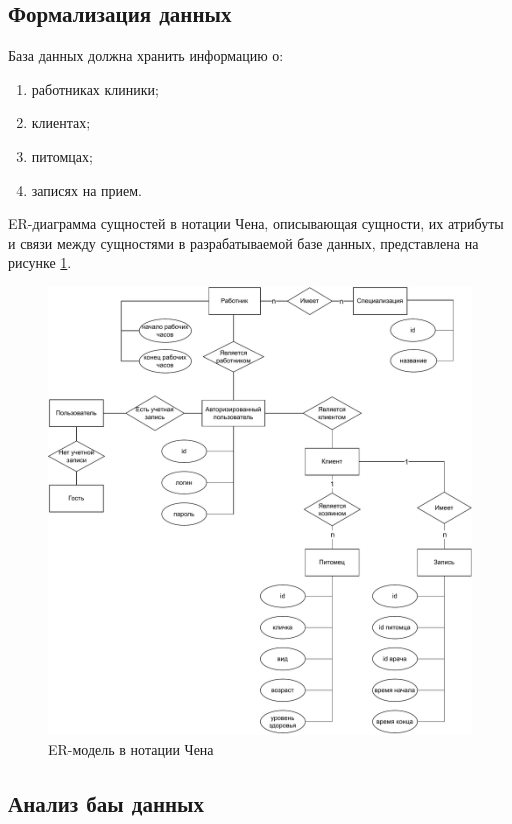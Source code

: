 \subsection{Формализация данных}

База данных должна хранить информацию о:
\begin{enumerate}[label*=---]
	\item работниках клиники;
	\item клиентах;
	\item питомцах;
	\item записях на прием.
\end{enumerate}

ER-диаграмма сущностей в нотации Чена, описывающая сущности, их атрибуты и связи между сущностями в разрабатываемой базе данных, представлена на рисунке \ref{img:er}.

\begin{figure}[!h!]
	\centering
	\includegraphics[width=170mm]{image/er.pdf}
	\caption{ER-модель в нотации Чена}
	\label{img:er}
\end{figure}
\newpage

\subsection{Анализ баы данных}

